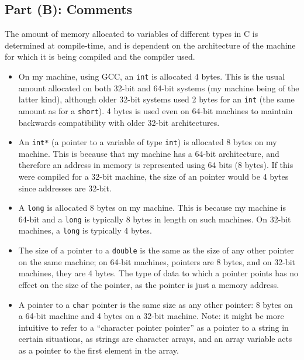 \documentclass[a4paper]{article}
\begin{document}
\subsection{Part (B): Comments}
The amount of memory allocated to variables of different types in C is determined at compile-time, and is dependent on the architecture of 
the machine for which it is being compiled and the compiler used.
\begin{itemize}
    \item   On my machine, using GCC, an \verb|int| is allocated 4 bytes. This is the usual amount allocated on both 32-bit and 64-bit systems (my machine being of the 
            latter kind), although older 32-bit systems used 2 bytes for an \verb|int| (the same amount as for a \verb|short|). 
            4 bytes is used even on 64-bit machines to maintain backwards compatibility with older 32-bit architectures.
    \item   An \verb|int*| (a pointer to a variable of type \verb|int|) is allocated 8 bytes on my machine.
            This is because that my machine has a 64-bit architecture, and therefore an address in memory is represented using 64 bits (8 bytes).
            If this were compiled for a 32-bit machine, the size of an pointer would be 4 bytes since addresses are 32-bit.
    \item   A \verb|long| is allocated 8 bytes on my machine. This is because my machine is 64-bit and a \verb|long| is typically 8 bytes in length on such machines.
            On 32-bit machines, a \verb|long| is typically 4 bytes.
    \item   The size of a pointer to a \verb|double| is the same as the size of any other pointer on the same machine; on 64-bit machines, pointers are 8 bytes, and on
            32-bit machines, they are 4 bytes. 
            The type of data to which a pointer points has no effect on the size of the pointer, as the pointer is just a memory address.
    \item   A pointer to a \verb|char| pointer is the same size as any other pointer: 8 bytes on a 64-bit machine and 4 bytes on a 32-bit machine.
            Note: it might be more intuitive to refer to a ``character pointer pointer'' as a pointer to a string in certain situations, as strings are character arrays,
            and an array variable acts as a pointer to the first element in the array. 
\end{itemize}
\end{document}
